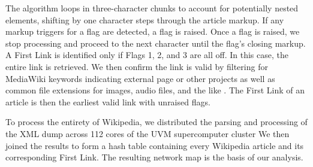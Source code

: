 \documentclass[pre,twocolumn,twoside,superscriptaddress,floatfix, aps, 10pt]{revtex4-1}
\begin{document}
The algorithm loops in three-character chunks to account for potentially nested elements, 
shifting by one character steps through the article markup.
If any markup triggers for a flag are detected, a flag is raised. 
Once a flag is raised, we stop processing and proceed to the next character
until the flag's closing markup.
A First Link is identified only if Flags 1, 2, and 3 are all off.
In this case, the entire link is retrieved. 
We then confirm the link is valid by filtering for MediaWiki keywords indicating external page or other projects
as well as common file extensions for 
images, audio files, and the like 
\cite{media_wiki_templates}.
The First Link of an article is then the earliest valid link with unraised flags.

To process the entirety of Wikipedia, we distributed the parsing and processing of the XML dump
across 112 cores of the UVM supercomputer cluster
\cite{vacc}
We then joined the results to form a hash table containing every Wikipedia article and its corresponding
First Link. The resulting network map is the basis of our analysis.
\end{document}

